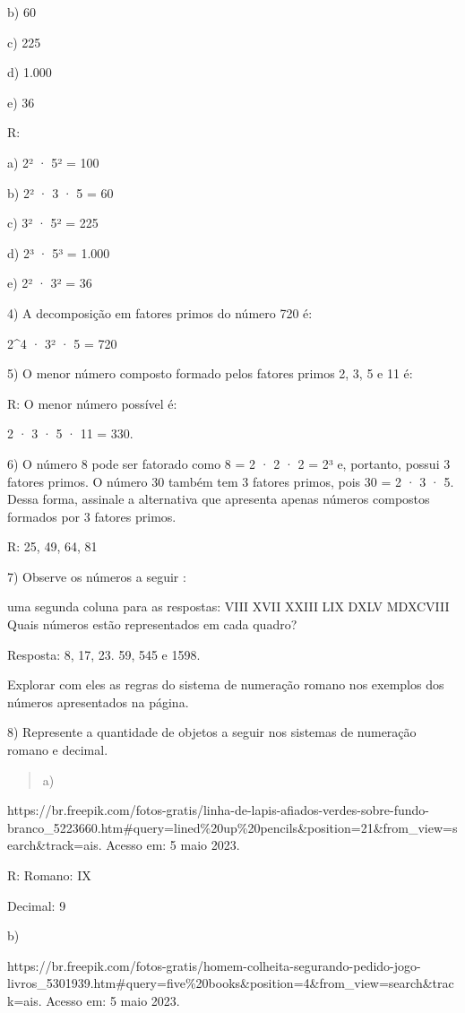 b) 60

c) 225

d) 1.000

e) 36

R:

a) 2² · 5² = 100

b) 2² · 3 · 5 = 60

c) 3² · 5² = 225

d) 2³ · 5³ = 1.000

e) 2² · 3² = 36

4) A decomposição em fatores primos do número 720 é:

2\^{}4 · 3² · 5 = 720

5) O menor número composto formado pelos fatores primos 2, 3, 5 e 11 é:

R: O menor número possível é:

2 · 3 · 5 · 11 = 330.

6) O número 8 pode ser fatorado como 8 = 2 · 2 · 2 = 2³ e, portanto,
possui 3 fatores primos. O número 30 também tem 3 fatores primos, pois
30 = 2 · 3 · 5. Dessa forma, assinale a alternativa que apresenta apenas
números compostos formados por 3 fatores primos.

R: 25, 49, 64, 81

7) Observe os números a seguir :

uma segunda coluna para as respostas: VIII XVII XXIII LIX DXLV MDXCVIII
Quais números estão representados em cada quadro?

Resposta: 8, 17, 23. 59, 545 e 1598.

Explorar com eles as regras do sistema de numeração romano nos exemplos
dos números apresentados na página.

8) Represente a quantidade de objetos a seguir nos sistemas de numeração
romano e decimal.

\begin{quote}
a)
\end{quote}

https://br.freepik.com/fotos-gratis/linha-de-lapis-afiados-verdes-sobre-fundo-branco\_5223660.htm\#query=lined\%20up\%20pencils\&position=21\&from\_view=search\&track=ais.
Acesso em: 5 maio 2023.

R: Romano: IX

Decimal: 9

b)

https://br.freepik.com/fotos-gratis/homem-colheita-segurando-pedido-jogo-livros\_5301939.htm\#query=five\%20books\&position=4\&from\_view=search\&track=ais.
Acesso em: 5 maio 2023.

